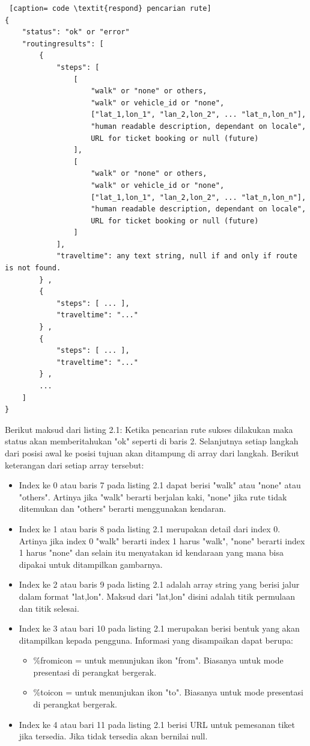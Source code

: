 \begin{lstlisting} [caption= code \textit{respond} pencarian rute]
{ 
    "status": "ok" or "error" 
    "routingresults": [ 
        {
            "steps": [
                [
                    "walk" or "none" or others,
                    "walk" or vehicle_id or "none",
                    ["lat_1,lon_1", "lan_2,lon_2", ... "lat_n,lon_n"],
                    "human readable description, dependant on locale",
                    URL for ticket booking or null (future)
                ],
                [
                    "walk" or "none" or others,
                    "walk" or vehicle_id or "none",
                    ["lat_1,lon_1", "lan_2,lon_2", ... "lat_n,lon_n"],
                    "human readable description, dependant on locale",
                    URL for ticket booking or null (future)
                ]
            ],
            "traveltime": any text string, null if and only if route is not found.
        } ,
        {
            "steps": [ ... ],
            "traveltime": "..."
        } ,
        {
            "steps": [ ... ],
            "traveltime": "..."
        } ,
        ...     
    ]
}
\end{lstlisting}
Berikut maksud dari listing 2.1:
\hspace{0.5cm} Ketika pencarian rute sukses dilakukan maka status akan memberitahukan "ok" seperti di baris 2. Selanjutnya setiap langkah dari posisi awal ke posisi tujuan akan ditampung di array dari langkah. Berikut keterangan dari setiap array tersebut: 

\begin{itemize}
	\item Index ke 0 atau baris 7 pada listing 2.1 dapat berisi "walk" atau "none" atau "others". Artinya  jika "walk" berarti berjalan kaki, "none" jika rute tidak ditemukan dan "others" berarti menggunakan kendaran.
	\item Index ke 1 atau baris 8 pada listing 2.1 merupakan detail dari index 0. Artinya jika index 0 "walk" berarti index 1 harus "walk", "none" berarti index 1 harus "none" dan selain itu menyatakan id kendaraan yang mana bisa dipakai untuk ditampilkan gambarnya.
	\item Index ke 2 atau baris 9 pada listing 2.1 adalah array string yang berisi jalur dalam format "lat,lon". Maksud dari "lat,lon" disini adalah titik permulaan dan titik selesai.
	\item Index ke 3 atau bari 10 pada listing 2.1 merupakan berisi bentuk yang akan ditampilkan kepada pengguna. Informasi yang disampaikan dapat berupa:
		\begin{itemize}
			\item \%fromicon = untuk menunjukan ikon "from". Biasanya untuk mode presentasi di perangkat bergerak.
			\item \%toicon = untuk menunjukan ikon "to". Biasanya untuk mode presentasi di perangkat bergerak. 
		\end{itemize}
	\item Index ke 4 atau bari 11 pada listing 2.1 berisi URL untuk pemesanan tiket jika tersedia. Jika tidak tersedia akan bernilai null.
\end{itemize}
 	 	

